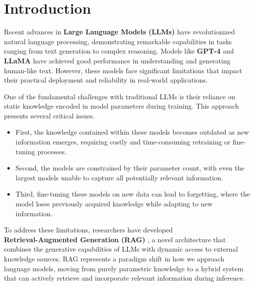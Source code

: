\documentclass[12pt]{article}
\begin{document}
    \newpage
    
    \renewcommand{\contentsname}{Contents}
    \tableofcontents
    \thispagestyle{empty} %

    \restoregeometry %
    \newpage
    \setcounter{page}{1}

    \section{Introduction}
    Recent advances in \textbf{Large Language Models (LLMs)} have revolutionized natural language 
    processing, demonstrating remarkable capabilities in tasks ranging from text generation 
    to complex reasoning. Models like \textbf{GPT-4} \cite{gpt4technicalreport} and 
    \textbf{LLaMA} \cite{llama3} have achieved good performance in understanding and generating 
    human-like text. However, these models face significant limitations that impact their practical 
    deployment and reliability in real-world applications.
    
    One of the fundamental challenges with traditional LLMs is their reliance on static 
    knowledge encoded in model parameters during training. This approach presents several 
    critical issues. 
    \begin{itemize}
        \item First, the knowledge contained within these models becomes outdated as 
        new information emerges, requiring costly and time-consuming retraining or fine-tuning 
        processes.
        
        \item Second, the models are constrained by their parameter count, with even the 
        largest models unable to capture all potentially relevant information.
        
        \item Third, fine-tuning these models on new data can lead to forgetting, 
        where the model loses previously acquired knowledge while adapting to new information. 
    \end{itemize}
    
    To address these limitations, researchers have developed \\ \textbf{Retrieval-Augmented Generation (RAG)} \cite{rag_paper}, 
    a novel architecture that combines the generative capabilities of LLMs with dynamic access 
    to external knowledge sources. RAG represents a paradigm shift in how we approach 
    language models, moving from purely parametric knowledge to a hybrid system that can 
    actively retrieve and incorporate relevant information during inference.
    
\end{document}
